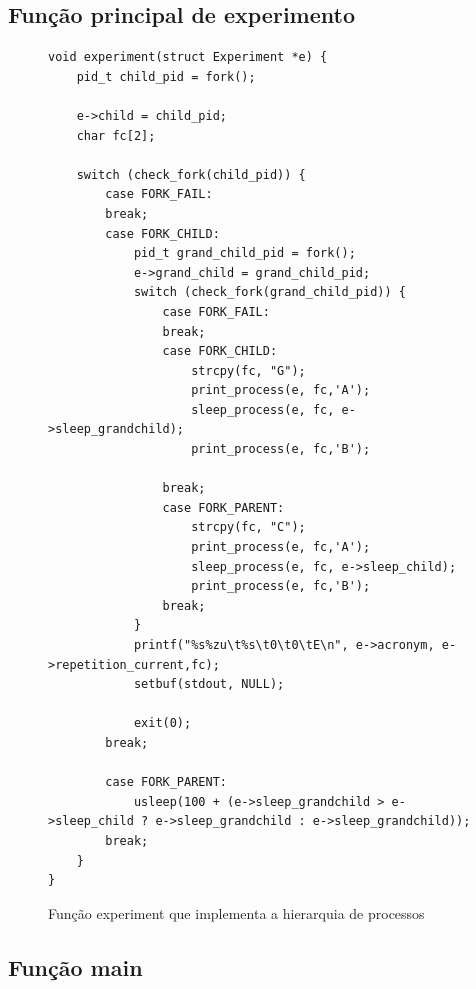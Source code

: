 \documentclass[12pt]{article}
\begin{document}
\subsection{Função principal de experimento}

\begin{figure}[ht]
\begin{verbatim}
void experiment(struct Experiment *e) {
    pid_t child_pid = fork();

    e->child = child_pid;
    char fc[2];

    switch (check_fork(child_pid)) {
        case FORK_FAIL:
        break;
        case FORK_CHILD:
            pid_t grand_child_pid = fork();
            e->grand_child = grand_child_pid;
            switch (check_fork(grand_child_pid)) {
                case FORK_FAIL:
                break;
                case FORK_CHILD:
                    strcpy(fc, "G");
                    print_process(e, fc,'A');
                    sleep_process(e, fc, e->sleep_grandchild);
                    print_process(e, fc,'B');

                break;
                case FORK_PARENT:
                    strcpy(fc, "C");
                    print_process(e, fc,'A');
                    sleep_process(e, fc, e->sleep_child);
                    print_process(e, fc,'B');
                break;
            }
            printf("%s%zu\t%s\t0\t0\tE\n", e->acronym, e->repetition_current,fc);
            setbuf(stdout, NULL);

            exit(0);
        break;

        case FORK_PARENT:
            usleep(100 + (e->sleep_grandchild > e->sleep_child ? e->sleep_grandchild : e->sleep_grandchild));
        break;
    }
}
\end{verbatim}
\caption{Função experiment que implementa a hierarquia de processos}
\label{fig:code2}
\end{figure}

\subsection{Função main}
\end{document}
